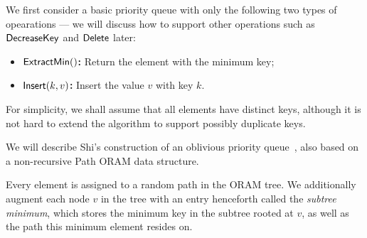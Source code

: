 \documentclass[11pt]{article}
\begin{document}
We first consider a basic priority queue with only the following
two types of opearations --- we will discuss how to support other operations such as
${\sf DecreaseKey}$ and ${\sf Delete}$ later:

\begin{itemize}
    \item \textbf{${\sf ExtractMin}()$:} Return the element with the minimum key;
    \item \textbf{${\sf Insert}(k, v)$:} Insert the value $v$ with key $k$.
\end{itemize}
For simplicity, we shall assume that all elements have distinct
keys, although it is not hard to extend
the algorithm
to support possibly 
duplicate keys.


We will describe Shi's construction of an oblivious  
priority queue~\cite{shi-opq}, also based on a non-recursive
Path ORAM data structure.

Every element is assigned to a random path in the ORAM tree.  
We additionally augment each node $v$ in the tree
with an entry henceforth called the {\it subtree minimum}, 
which stores the minimum 
key in the subtree rooted at $v$, as well as the path this minimum element resides on. 
\end{document}
